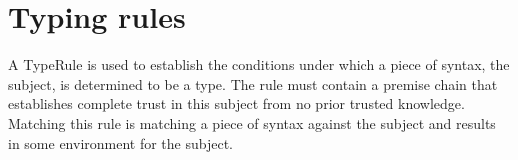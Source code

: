 \section{Typing rules}
\label{section-rules}

A TypeRule is used to establish the conditions under which a piece
of syntax, the subject, is determined to be a type. The rule
must contain a premise chain that establishes complete trust in
this subject from no prior trusted knowledge. Matching this rule is
matching a piece of syntax against the subject and results in some
environment for the subject.

